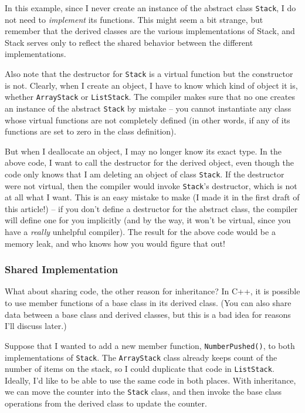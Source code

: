 In this example, since I never create an instance of the
abstract class {\tt Stack}, I do not need to {\em implement} its
functions.  This might seem a bit strange, but remember that
the derived classes are the various implementations of Stack,
and Stack serves only to reflect the shared behavior between
the different implementations.

Also note that the destructor for {\tt Stack} is a virtual
function but the constructor is not.  Clearly, when I create an
object, I have to know which kind of object it is, whether
{\tt ArrayStack} or {\tt ListStack}.  The compiler
makes sure that no one creates an instance of the abstract {\tt Stack}
by mistake -- you cannot instantiate any class whose virtual
functions are not completely defined (in other words, if any of
its functions are set to zero in the class definition).

But when I deallocate an object, I may no longer know its exact
type.  In the above code, I want to call the destructor for the
derived object, even though the code only knows that I am deleting
an object of class {\tt Stack}.  If the destructor were not virtual,
then the compiler would invoke {\tt Stack}'s destructor, which is
not at all what I want.  This is an easy mistake to make (I made
it in the first draft of this article!) -- if you don't define
a destructor for the abstract class, the compiler will define one
for you implicitly (and by the way, it won't be virtual, since you
have a {\em really} unhelpful compiler).  The result for the
above code would be a memory leak, and who knows how you would
figure that out!

\subsubsection{Shared Implementation}

What about sharing code, the other reason for inheritance?
In C++, it is possible to use member functions
of a base class in its derived class.  (You can also share
data between a base class and derived classes, but this
is a bad idea for reasons I'll discuss later.)

Suppose that I wanted to add a new member function,
{\tt NumberPushed()}, to both implementations of {\tt Stack}.
The {\tt ArrayStack} class already keeps count of the number of
items on the stack, so I could duplicate that code in {\tt ListStack}.
Ideally, I'd like to be able to use the same code in both places.
With inheritance, we can move the counter into the
{\tt Stack} class, and then invoke the base class operations
from the derived class to update the counter.

